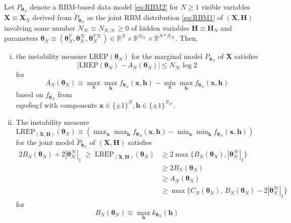 \documentclass[]{article}
\theoremstyle{definition}
\newcommand{\REP}{\mathrm{LREP}}
\newcommand{\elt}{A_{N}(\boldsymbol \theta_N) }
\newcommand{\Gam}{B_{N}(\boldsymbol \theta_N) }
\newcommand{\Gamc}{C_{N}(\boldsymbol \theta_N) }
\begin{document}
\protect\hypertarget{prp:prop2}{}{\label{prp:prop2}}Let
\(P_{\boldsymbol \theta_N}\) denote a RBM-based data model \eqref{eq:RBM2}
for \(N\geq 1\) visible variables
\(\boldsymbol X \equiv \boldsymbol X_N\) derived from
\(\tilde{P}_{\boldsymbol \theta_N}\) as the joint RBM distribution
\eqref{eq:RBM1} of \((\boldsymbol X, \boldsymbol H)\) involving some
number \(N_{\mathcal{H}} \equiv N_{N,\mathcal{H}}\geq 0\) of hidden
variables \(\boldsymbol H \equiv \boldsymbol H_N\) and parameters
\(\boldsymbol \theta_N \equiv (\boldsymbol \theta_N^{\mathcal{V}},\boldsymbol \theta_N^{\mathcal{H}}, \boldsymbol \theta_N^{\mathcal{VH}}) \in\mathbb{R}^{N}\times \mathbb{R}^{N_{\mathcal{H}}} \times \mathbb{R}^{N*N_{\mathcal{H}}}\).
Then,
\begin{enumerate}[(i)]
\item the instability measure $\REP(\boldsymbol \theta_N)$ for the marginal model $P_{\boldsymbol \theta_N}$ of  $\boldsymbol X$ satisfies
    $$
    \left| \REP(\boldsymbol \theta_N)  - \elt\right| \leq    N_{\mathcal{H}}  \log 2
    $$
    for
    $$
    \elt  \equiv   \max_{ \boldsymbol x} \max_{ \boldsymbol h  } f_{\boldsymbol \theta_N} (\boldsymbol x, \boldsymbol h)-\min_{ \boldsymbol x } \max_{ \boldsymbol h }f_{\boldsymbol \theta_N} (\boldsymbol x, \boldsymbol h)
    $$
    based on $f_{\boldsymbol \theta_N}$ from \\eqref{eq:f} with components $\boldsymbol x \in \{\pm 1\}^{N}, \boldsymbol h \in \{\pm 1\}^{N_{\mathcal{H}}}$.
\item The instability measure $\REP_{(\boldsymbol X, \boldsymbol H)}(\boldsymbol \theta_N)\equiv \left(\max_{ \boldsymbol x} \max_{ \boldsymbol h  } f_{\boldsymbol \theta_N} (\boldsymbol x, \boldsymbol h)-\min_{ \boldsymbol x } \min_{ \boldsymbol h }f_{\boldsymbol \theta_N} (\boldsymbol x, \boldsymbol h)\right)$ for the joint model $\tilde{P}_{\boldsymbol \theta_N}$ of $(\boldsymbol X, \boldsymbol H)$ satisfies
    \begin{align*}
    2\Gam +  2|\boldsymbol \theta_N^{\mathcal{H}} |_{1} \; \geq \; \REP_{(\boldsymbol X, \boldsymbol H)}(\boldsymbol \theta_N)    & \geq 
    2\max\big\{\Gam,   |\boldsymbol \theta_N^{\mathcal{H}} |_{1}\big\} \\
    &\geq  2\Gam\\
    &\geq  \elt\\
    &\geq   \max\big\{  \Gamc, \, \Gam  - 2|\boldsymbol \theta_N^{\mathcal{H}} |_{1}  \big\}
    \end{align*}
    for
    $$
    \Gam \equiv \max_{ \boldsymbol h} k_{\boldsymbol \theta_N} (\boldsymbol h)
$$
\end{enumerate}
\end{document}
